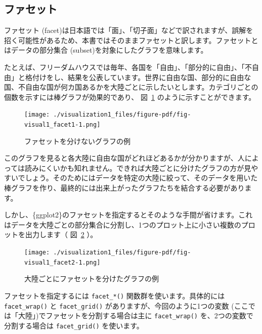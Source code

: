 \documentclass[
  a4paper,
  pandoc,
  ja=standard,
  jafont=haranoaji]{bxjsbook}
\begin{document}
\hypertarget{ux30d5ux30a1ux30bbux30c3ux30c8}{%
\subsection{ファセット}\label{ux30d5ux30a1ux30bbux30c3ux30c8}}

ファセット
(facet)は日本語では「面」、「切子面」などで訳されますが、誤解を招く可能性があるため、本書ではそのままファセットと訳します。ファセットとはデータの部分集合
(subset)を対象にしたグラフを意味します。

たとえば、フリーダムハウスでは毎年、各国を「自由」、「部分的に自由」、「不自由」と格付けをし、結果を公表しています。世界に自由な国、部分的に自由な国、不自由な国が何カ国あるかを大陸ごとに示したいとします。カテゴリごとの個数を示すには棒グラフが効果的であり、
図~\ref{fig-visual1_facet1} のように示すことができます。

\begin{figure}

{\centering \texttt{[image: ./visualization1\_files/figure-pdf/fig-visual1\_facet1-1.png]}

}

\caption{\label{fig-visual1_facet1}ファセットを分けないグラフの例}

\end{figure}

このグラフを見ると各大陸に自由な国がどれほどあるかが分かりますが、人によっては読みにくいかも知れません。できれば大陸ごとに分けたグラフの方が見やすいでしょう。そのためにはデータを特定の大陸に絞って、そのデータを用いた棒グラフを作り、最終的には出来上がったグラフたちを結合する必要があります。

しかし、\{ggplot2\}のファセットを指定するとそのような手間が省けます。これはデータを大陸ごとの部分集合に分割し、1つのプロット上に小さい複数のプロットを出力します（
図~\ref{fig-visual1_facet2} ）。

\begin{figure}

{\centering \texttt{[image: ./visualization1\_files/figure-pdf/fig-visual1\_facet2-1.png]}

}

\caption{\label{fig-visual1_facet2}大陸ごとにファセットを分けたグラフの例}

\end{figure}

ファセットを指定するには \texttt{facet\_*()}
関数群を使います。具体的には \texttt{facet\_wrap()} と
\texttt{facet\_grid()} がありますが、今回のように1つの変数
(ここでは「大陸」)でファセットを分割する場合は主に
\texttt{facet\_wrap()} を、2つの変数で分割する場合は
\texttt{facet\_grid()} を使います。
\end{document}
